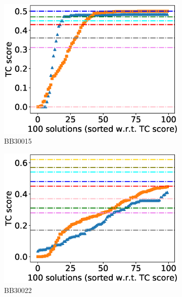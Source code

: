 \begin{figure}[!htbp]
\begin{adjustwidth}{-1cm}{-1cm}
		\begin{subfigure}{0.22\textwidth}
			\includegraphics[width=\columnwidth]{Figure/summary/precomputedInit/Balibase/BB30015_tc_density_single_run_2}
			\caption{BB30015}
		\end{subfigure}
		\begin{subfigure}{0.22\textwidth}
			\includegraphics[width=\columnwidth]{Figure/summary/precomputedInit/Balibase/BB30022_tc_density_single_run_2}
			\caption{BB30022}
		\end{subfigure}
		\begin{subfigure}{0.22\textwidth}

\end{subfigure}
\end{adjustwidth}
\end{figure}
